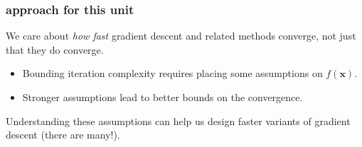 \documentclass[compress]{beamer}
\newcommand{\bv}[1]{\mathbf{#1}}
\begin{document}
\begin{frame}[t]
	\frametitle{approach for this unit}
	We care about \emph{how fast} gradient descent and related methods converge, not just that they do converge. 
	\begin{itemize}
		\item Bounding iteration complexity requires placing some assumptions on $f(\bv{x})$. 
		\item Stronger assumptions lead to better bounds on the convergence. 
	\end{itemize}
	Understanding these assumptions can help us design faster variants of gradient descent (there are many!). 
\end{frame}
%
%
%
%	
%	
%
\end{document}
